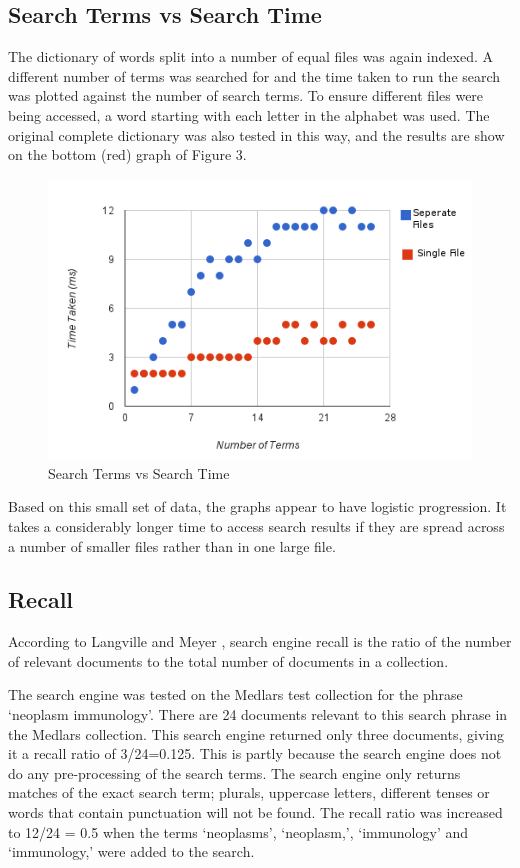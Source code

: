 \documentclass[12pt, a4paper,oneside,twocolumn]{article}
\begin{document}
\subsection{Search Terms vs Search Time}
The dictionary of words split into a number of equal files was again indexed. A different number of terms was searched for and the time taken to run the search was plotted against the number of search terms. To ensure different files were being accessed, a word starting with each letter in the alphabet was used.
The original complete dictionary was also tested in this way, and the results are show on the bottom (red) graph of Figure 3.
\begin{figure}[htp]
\centering
\includegraphics[scale=0.45]{searchTermsvstime.png}
\caption{Search Terms vs Search Time}
\label{}
\end{figure}

Based on this small set of data, the graphs appear to have logistic progression. It takes a considerably longer time to access search results if they are spread across a number of smaller files rather than in one large file.

\subsection{Recall}
According to Langville and Meyer \cite{google}, search engine recall is the ratio of the number of relevant documents to the total number of documents in a collection. 

The search engine was tested on the Medlars test collection \cite{medlars} for the phrase `neoplasm immunology'. There are 24 documents relevant to this search phrase in the Medlars collection. This search engine returned only three documents, giving it a recall ratio of 3/24=0.125. This is partly because the search engine does not do any pre-processing of the search terms. The search engine only returns matches of the exact search term; plurals, uppercase letters, different tenses or words that contain punctuation will not be found. The recall ratio was increased to 12/24 = 0.5 when the terms `neoplasms', `neoplasm,', `immunology' and `immunology,' were added to the search.
\end{document}

